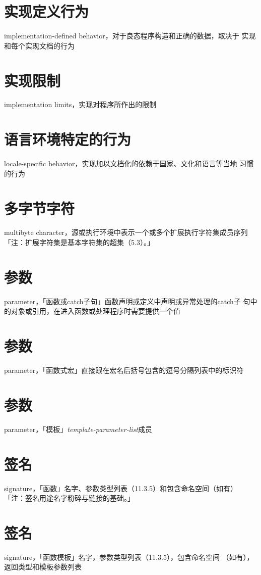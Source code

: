 \section{实现定义行为}
\noindent implementation-defined behavior，对于良态程序构造和正确的数据，取决于
实现和每个实现文档的行为

\section{实现限制}
\noindent implementation limits，实现对程序所作出的限制

\section{语言环境特定的行为}
\noindent locale-specific behavior，实现加以文档化的依赖于国家、文化和语言等当地
习惯的行为

\section{多字节字符}
\noindent multibyte character，源或执行环境中表示一个或多个扩展执行字符集成员序列
「注：扩展字符集是基本字符集的超集（5.3）。」

\section{参数}
\noindent parameter，「函数或catch子句」函数声明或定义中声明或异常处理的catch子
句中的对象或引用，在进入函数或处理程序时需要提供一个值

\section{参数}
\noindent parameter，「函数式宏」直接跟在宏名后括号包含的逗号分隔列表中的标识符

\section{参数}
\noindent parameter，「模板」\textit{template-parameter-list}成员

\section{签名}
\noindent signature，「函数」名字、参数类型列表（11.3.5）和包含命名空间（如有）\\
「注：签名用途名字粉碎与链接的基础。」

\section{签名}
\noindent signature，「函数模板」名字，参数类型列表（11.3.5），包含命名空间
（如有），返回类型和模板参数列表

